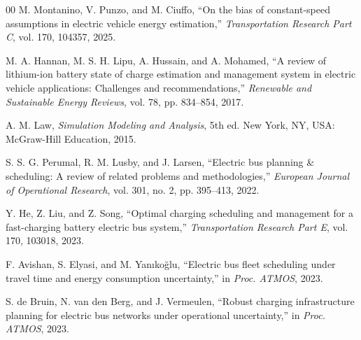\documentclass[conference]{IEEEtran}
\begin{document}
\begin{thebibliography}{00}
 M. Montanino, V. Punzo, and M. Ciuffo, ``On the
bias of constant-speed assumptions in electric vehicle energy
estimation,'' \emph{Transportation Research Part C}, vol. 170, 104357,
2025.

 M. A. Hannan, M. S. H. Lipu, A. Hussain, and
A. Mohamed, ``A review of lithium-ion battery state of charge estimation
and management system in electric vehicle applications: Challenges and
recommendations,'' \emph{Renewable and Sustainable Energy Reviews},
vol. 78, pp. 834--854, 2017.

 A. M. Law, \emph{Simulation Modeling and Analysis},
5th ed. New York, NY, USA: McGraw-Hill Education, 2015.

 S. S. G. Perumal, R. M. Lusby, and J. Larsen,
``Electric bus planning \& scheduling: A review of related problems and
methodologies,'' \emph{European Journal of Operational Research},
vol. 301, no. 2, pp. 395--413, 2022.

 Y. He, Z. Liu, and Z. Song, ``Optimal charging
scheduling and management for a fast-charging battery electric bus
system,'' \emph{Transportation Research Part E}, vol. 170, 103018, 2023.

 F. Avishan, S. Elyasi, and M. Yanıkoğlu, ``Electric
bus fleet scheduling under travel time and energy consumption
uncertainty,'' in \emph{Proc. ATMOS}, 2023.

 S. de Bruin, N. van den Berg, and J. Vermeulen,
``Robust charging infrastructure planning for electric bus networks under
operational uncertainty,'' in \emph{Proc. ATMOS}, 2023.

\end{thebibliography}
\end{document}

